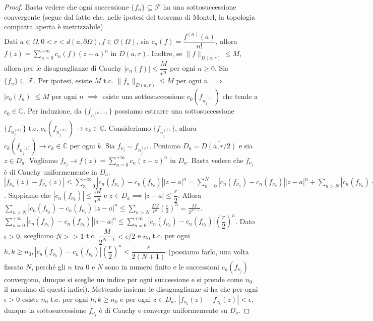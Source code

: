 \begin{proof}
  Basta vedere che ogni successione $\{f_n\} \subseteq \mathcal{F}$ ha una sottosuccessione convergente (segue dal fatto che, nelle ipotesi del teorema di Montel, la topologia compatta aperta è metrizzabile). \\
  Dati $a \in \Omega, 0<r<d(a, \partial \Omega), f \in \mathcal{O}(\Omega)$, sia $c_n(f)=\dfrac{f^{(n)}(a)}{n!}$, allora $\displaystyle f(z)=\sum_{n=0}^{+\infty} c_n(f)(z-a)^n$ in $\overline{D(a, r)}$.
  Inoltre, se $\|f\|_{\overline{D(a, r)}} \le M$, allora per le disuguaglianze di Cauchy $|c_n(f)| \le \dfrac{M}{r^n}$ per ogni $n \ge 0$.
  Sia $\{f_n\} \subseteq \mathcal{F}$. Per ipotesi, esiste $M$ t.c. $\|f_n\|_{\overline{D(a, r)}} \le M$ per ogni $n$ $\implies$ $|c_0(f_n)| \le M$ per ogni $n$ $\implies$ esiste una sottosuccessione $c_0(f_{n_j^{(0)}})$ che tende a $c_0 \in \mathbb{C}$.
  Per  induzione, da $\{f_{n_j^{(k-1)}}\}$ possiamo estrarre una sottosuccessione $\{f_{n_j^{(k)}}\}$ t.c. $c_k(f_{n_j^{(k)}}) \rightarrow c_k \in \mathbb{C}$. Consideriamo $\{f_{n_j^{(j)}}\}$, allora $c_k(f_{n_j^{(j)}}) \rightarrow c_k \in \mathbb{C}$ per ogni $k$.
  Sia $f_{\nu_j}=f_{n_j^{(j)}}$. Poniamo $D_a=\overline{D(a, r/2)}$ e sia $z \in D_a$. Vogliamo $\displaystyle f_{\nu_j} \rightarrow f(z)=\sum_{n=0}^{+\infty} c_n(z-a)^n$ in $D_a$. Basta vedere che $f_{\nu_j}$ è di Cauchy uniformemente in $D_a$.
  $\displaystyle |f_{\nu_h}(z)-f_{\nu_k}(z)| \le \sum_{n=0}^{+\infty} |c_n(f_{\nu_h})-c_n(f_{\nu_k})||z-a|^n=\sum_{n=0}^N |c_n(f_{\nu_h})-c_n(f_{\nu_k})||z-a|^n+\sum_{n>N} |c_n(f_{\nu_h})-c_n(f_{\nu_k})||z-a|^n$.
  Sappiamo che $|c_n(f_{\nu_k})| \le \dfrac{M}{r^n}$ e $z \in D_a \implies |z-a| \le \dfrac{r}{2}$.
  Allora $\displaystyle \sum_{n>N} |c_n(f_{\nu_h})-c_n(f_{\nu_k})||z-a|^n \le \sum_{n>N} \frac{2M}{r^n}\left(\frac{r}{2}\right)^n=\frac{M}{2^{N-1}}$.
  $\displaystyle \sum_{n=0}^{+\infty} |c_n(f_{\nu_h})-c_n(f_{\nu_k})||z-a|^n \le \sum_{n=0}^{+\infty} |c_n(f_{\nu_h})-c_n(f_{\nu_k})|\left(\dfrac{r}{2}\right)^n$.
  Dato $\epsilon>0$, scegliamo $N>>1$ t.c. $\dfrac{M}{2^{N-1}}<\epsilon/2$ e $n_0$ t.c. per ogni $h, k \ge n_0, |c_n(f_{\nu_h})-c_n(f_{\nu_k})|\left(\dfrac{r}{2}\right)^n<\dfrac{\epsilon}{2(N+1)}$
  (possiamo farlo, una volta fissato $N$, perché gli $n$ tra $0$ e $N$ sono in numero finito e le successioni $c_n(f_{\nu_j})$ convergono, dunque si sceglie un indice per ogni successione e si prende come $n_0$ il massimo di questi indici).
  Mettendo insieme le disuguaglianze si ha che per ogni $\epsilon>0$ esiste $n_0$ t.c. per ogni $h, k \ge n_0$ e per ogni $z \in D_a$, $|f_{\nu_k}(z)-f_{\nu_k}(z)|<\epsilon$, dunque la sottosuccessione $f_{\nu_j}$ è di Cauchy e converge uniformemente su $D_a$.

\end{proof}
